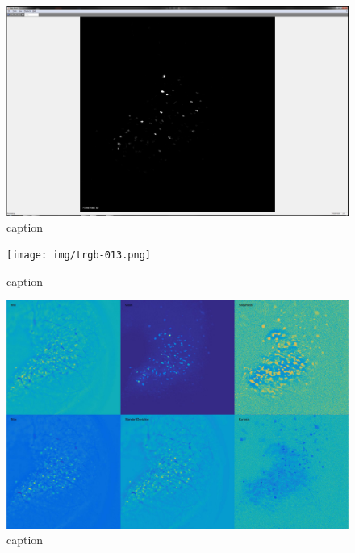 \documentclass[../main.tex]{subfiles}
\begin{document}
\begin{figure}[htb]\centering
	\includegraphics[width=15cm]{sw-sequence-bw.png}
	\caption{caption}
\end{figure}

\begin{figure}[htb]\centering
	\texttt{[image: img/trgb-013.png]}
	\caption{caption}
\end{figure}

\begin{figure}[htb]\centering
	\includegraphics[width=15cm]{statistics_of_128_frames_contrast_enhanced.jpg}
	\caption{caption}
\end{figure}

\clearpage
\end{document}
